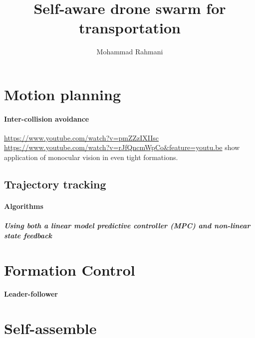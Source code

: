 \documentclass{article}
\begin{document}
	
	\title{Self-aware drone swarm for transportation}
	\author{Mohammad Rahmani}
	\date{}
	\maketitle
	\section{Motion planning}
		\paragraph{Inter-collision avoidance}
			\cite{baca-2018-model-predictive-trajectory-tracking-and-collision-avoidance-for-reliable-outdoor-deployment-of-unmanned-aerial-vehicles}
			\url{https://www.youtube.com/watch?v=pmZZzIXIIsc}
			\url{https://www.youtube.com/watch?v=rJfQncmWpCo\&feature=youtu.be} show application of monocular vision in even tight formations.
		\subsection{Trajectory tracking}
			\cite{baca-2018-model-predictive-trajectory-tracking-and-collision-avoidance-for-reliable-outdoor-deployment-of-unmanned-aerial-vehicles}
			\paragraph{Algorithms}
				\subparagraph{Using both a linear model predictive controller (MPC) and non-linear state feedback}
				\cite{baca-2018-model-predictive-trajectory-tracking-and-collision-avoidance-for-reliable-outdoor-deployment-of-unmanned-aerial-vehicles}
	\section{Formation Control}
		\cite{mora-2018-distributed-multi-robot-formation-control-in-dynamic-environments}
		\cite{mora-2017-multi-robot-formation-control-and-object-transport-in-dynamic-environments-via-constrained-optimization}
		\paragraph{Leader-follower}
	\section{Self-assemble}
		\cite{saldana-2018-modquad-the-flying-modular-structure-that-self-assembles-in-midair}
\end{document}
